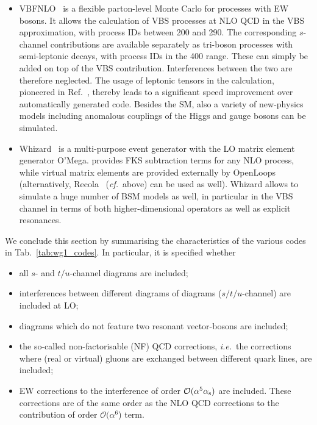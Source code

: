 \begin{itemize}
  \item {\sc VBFNLO}~\cite{Arnold:2008rz, Arnold:2011wj, Baglio:2014uba} is a flexible
    parton-level Monte Carlo for processes with EW bosons. It
    allows the calculation of VBS processes at NLO QCD in the VBS
    approximation, with process IDs between 200 and 290. The corresponding
    $s$-channel contributions are available separately as tri-boson processes with
    semi-leptonic decays, with process IDs in the 400 range. These can simply
    be added on top of the VBS contribution. Interferences between the two are therefore neglected.
    The usage of leptonic tensors in the calculation, pioneered in
    Ref.~\cite{Jager:2006zc}, thereby leads to a significant speed improvement over
    automatically generated code.  Besides the SM, also a variety of
    new-physics models including anomalous couplings of the Higgs and gauge
    bosons can be simulated.

  \item {\sc Whizard}~\cite{Moretti:2001zz,Kilian:2007gr} is a multi-purpose
      event generator with the LO matrix element generator {\sc O'Mega}. 
provides FKS subtraction terms for any NLO process, while virtual matrix
elements are provided externally by {\sc
OpenLoops}~\cite{Cascioli:2011va} (alternatively, {\sc Recola}~\cite{Actis:2012qn,Actis:2016mpe}
(\emph{cf.}\ above) can be used as well). {\sc Whizard} allows to simulate a
huge number of BSM models as well, in particular in
the VBS channel in terms of both higher-dimensional operators as well as explicit
resonances.

\end{itemize}

We conclude this section by summarising the characteristics of the various codes in Tab.~\ref{tab:wg1_codes}.
In particular, it is specified whether
\begin{itemize}
    \item all $s$- and $t/u$-channel diagrams are included;
    \item interferences between different diagrams of diagrams ($s/t/u$-channel) are included at LO;
    \item diagrams which do not feature two resonant vector-bosons are included;
    \item the so-called non-factorisable (NF) QCD corrections, \emph{i.e.}\ the corrections where (real or virtual) gluons are exchanged between different quark lines,
        are included;
    \item EW corrections to the interference of order $\mathcal O (\alpha^5\alpha_\text{s})$ are included.
    These corrections are of the same order as the NLO QCD corrections to the contribution of order $\mathcal O (\alpha^6$) term.
\end{itemize}


